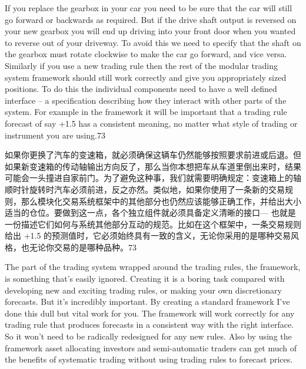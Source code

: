 \begin{englishblock} If you replace the gearbox in your car you need to be sure that the car will still go forward or backwards as required. But if the drive shaft output is reversed on your new gearbox you will end up driving into your front door when you wanted to reverse out of your driveway. To avoid this we need to specify that the shaft on the gearbox must rotate clockwise to make the car go forward, and vice versa. Similarly if you use a new trading rule then the rest of the modular trading system framework should still work correctly and give you appropriately sized positions. To do this the individual components need to have a well defined interface -- a specification describing how they interact with other parts of the system. For example in the framework it will be important that a trading rule forecast of say +1.5 has a consistent meaning, no matter what style of trading or instrument you are using.73 \end{englishblock}

\begin{chineseblock}如果你更换了汽车的变速箱，就必须确保这辆车仍然能够按照要求前进或后退。但如果新变速箱的传动轴输出方向反了，那么当你本想把车从车道里倒出来时，结果可能会一头撞进自家前门。为了避免这种事，我们就需要明确规定：变速箱上的轴顺时针旋转时汽车必须前进，反之亦然。类似地，如果你使用了一条新的交易规则，那么模块化交易系统框架中的其他部分也仍然应该能够正确工作，并给出大小适当的仓位。要做到这一点，各个独立组件就必须具备定义清晰的接口--- 也就是一份描述它们如何与系统其他部分互动的规范。比如在这个框架中，一条交易规则给出 +1.5 的预测值时，它必须始终具有一致的含义，无论你采用的是哪种交易风格，也无论你交易的是哪种品种。73 \end{chineseblock}


\begin{englishblock} The part of the trading system wrapped around the trading rules, the framework, is something that's easily ignored. Creating it is a boring task compared with developing new and exciting trading rules, or making your own discretionary forecasts. But it's incredibly important. By creating a standard framework I've done this dull but vital work for you. The framework will work correctly for any trading rule that produces forecasts in a consistent way with the right interface. So it won't need to be radically redesigned for any new rules. Also by using the framework asset allocating investors and semi-automatic traders can get much of the benefits of systematic trading without using trading rules to forecast prices. \end{englishblock}

